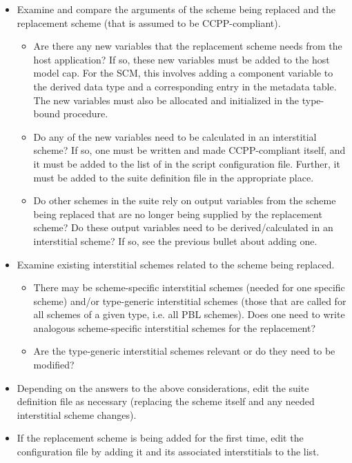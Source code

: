 \begin{itemize}
\item Examine and compare the arguments of the scheme being replaced and the replacement scheme (that is assumed to be CCPP-compliant).
\begin{itemize}
\item Are there any new variables that the replacement scheme needs from the host application? If so, these new variables must be added to the host model cap. For the SCM, this involves adding a component variable to the  derived data type and a corresponding entry in the metadata table. The new variables must also be allocated and initialized in the  type-bound procedure. 
\item Do any of the new variables need to be calculated in an interstitial scheme? If so, one must be written and made CCPP-compliant itself, and it must be added to the list of  in the  script configuration file. Further, it must be added to the suite definition file in the appropriate place.
\item Do other schemes in the suite rely on output variables from the scheme being replaced that are no longer being supplied by the replacement scheme? Do these output variables need to be derived/calculated in an interstitial scheme? If so, see the previous bullet about adding one.
\end{itemize}
\item Examine existing interstitial schemes related to the scheme being replaced. 
\begin{itemize}
\item There may be scheme-specific interstitial schemes (needed for one specific scheme) and/or type-generic interstitial schemes (those that are called for all schemes of a given type, i.e. all PBL schemes). Does one need to write analogous scheme-specific interstitial schemes for the replacement? 
\item Are the type-generic interstitial schemes relevant or do they need to be modified?
\end{itemize}
\item Depending on the answers to the above considerations, edit the suite definition file as necessary (replacing the scheme itself and any needed interstitial scheme changes).
\item If the replacement scheme is being added for the first time, edit the  configuration file by adding it and its associated interstitials to the  list.
\end{itemize}
